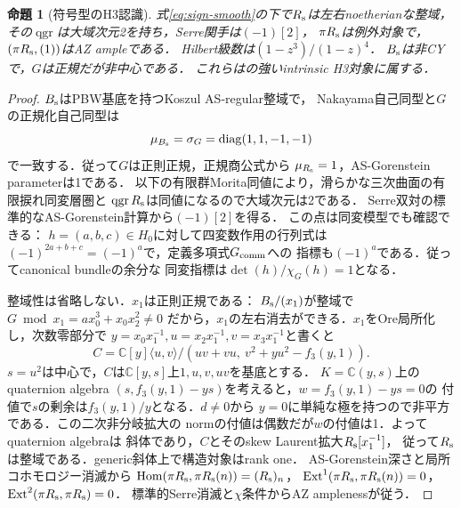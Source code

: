 \documentclass[11pt,a4paper]{ltjsarticle}
\newtheorem{proposition}[theorem]{命題}
\theoremstyle{definition}
\newcommand{\qgr}{\operatorname{qgr}}
\begin{document}
\begin{proposition}[符号型のH3認識]\label{prop:sign-H3}
式\eqref{eq:sign-smooth}の下で$R_{\rm s}$は左右noetherianな整域，
その$\qgr$は大域次元2を持ち，Serre関手は$(-1)[2]$，
$\pi R_{\rm s}$は例外対象で，$(\pi R_{\rm s},(1))$はAZ ampleである．
Hilbert級数は$(1-z^3)/(1-z)^4$．
$B_{\rm s}$は非CYで，$G$は正規だが非中心である．
これらは\cite{Current}の強いintrinsic H3対象に属する．
\end{proposition}
\begin{proof}
$B_{\rm s}$はPBW基底を持つKoszul AS-regular整域で，
Nakayama自己同型と$G$の正規化自己同型は
\[
 \mu_{B_{\rm s}}=\sigma_G=\operatorname{diag}(1,1,-1,-1)
\]
で一致する．従って$G$は正則正規，正規商公式から
$\mu_{R_{\rm s}}=1$，AS-Gorenstein parameterは1である．
以下の有限群Morita同値により，滑らかな三次曲面の有限捩れ同変層圏と
$\qgr R_{\rm s}$は同値になるので大域次元は2である．
Serre双対の標準的なAS-Gorenstein計算から$(-1)[2]$を得る．
この点は同変模型でも確認できる：
$h=(a,b,c)\in H_0$に対して四変数作用の行列式は
$(-1)^{2a+b+c}=(-1)^a$で，定義多項式$G_{\rm comm}$への
指標も$(-1)^a$である．従ってcanonical bundleの余分な
同変指標は$\det(h)/\chi_G(h)=1$となる．

整域性は省略しない．$x_1$は正則正規である：
$B_{\rm s}/(x_1)$が整域で$G\bmod x_1=ax_0^3+x_0x_2^2\ne0$
だから，$x_1$の左右消去ができる．$x_1$をOre局所化し，次数零部分で
$y=x_0x_1^{-1},u=x_2x_1^{-1},v=x_3x_1^{-1}$と書くと
\[
 C=\mathbb C[y]\langle u,v\rangle/
 (uv+vu,\ v^2+yu^2-f_3(y,1)).
\]
$s=u^2$は中心で，$C$は$\mathbb C[y,s]$上$1,u,v,uv$を基底とする．
$K=\mathbb C(y,s)$上のquaternion algebra
$(s,f_3(y,1)-ys)$を考えると，$w=f_3(y,1)-ys=0$の
付値で$s$の剰余は$f_3(y,1)/y$となる．$d\ne0$から
$y=0$に単純な極を持つので非平方である．この二次非分岐拡大の
normの付値は偶数だが$w$の付値は1．よってquaternion algebraは
斜体であり，$C$とそのskew Laurent拡大$R_{\rm s}[x_1^{-1}]$，
従って$R_{\rm s}$は整域である．generic斜体上で構造対象はrank one．
AS-Gorenstein深さと局所コホモロジー消滅から
$\operatorname{Hom}(\pi R_{\rm s},\pi R_{\rm s}(n))=(R_{\rm s})_n$，
$\operatorname{Ext}^1(\pi R_{\rm s},\pi R_{\rm s}(n))=0$，
$\operatorname{Ext}^2(\pi R_{\rm s},\pi R_{\rm s})=0$．
標準的Serre消滅と$\chi$条件からAZ amplenessが従う．
\end{proof}
\end{document}

